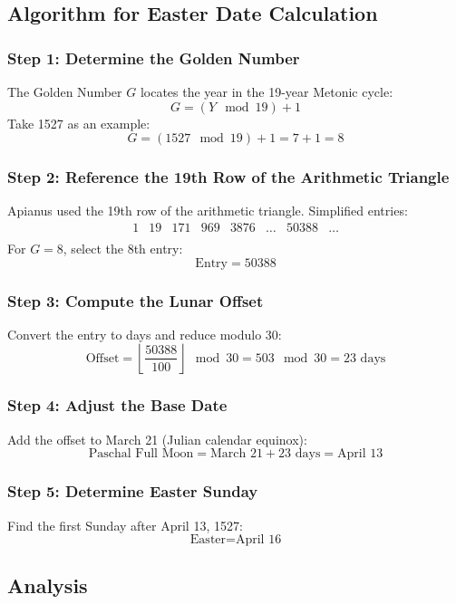 \documentclass{article}
\begin{document}
\subsection{Algorithm for Easter Date Calculation}

\subsubsection{Step 1: Determine the Golden Number}
The Golden Number \( G \) locates the year in the 19-year Metonic cycle:
\[
G = (Y \mod 19) + 1
\]
Take 1527 as an example:
\[
G = (1527 \mod 19) + 1 = 7 + 1 = 8
\]

\subsubsection{Step 2: Reference the 19th Row of the Arithmetic Triangle}
Apianus used the 19th row of the arithmetic triangle. Simplified entries:
\[
\begin{array}{cccccccc}
1 & 19 & 171 & 969 & 3876 & \ldots & 50388 & \ldots \\
\end{array}
\]
For \( G = 8 \), select the 8th entry:
\[
\text{Entry} = 50388
\]

\subsubsection{Step 3: Compute the Lunar Offset}
Convert the entry to days and reduce modulo 30:
\[
\text{Offset} = \left\lfloor \frac{50388}{100} \right\rfloor \mod 30 = 503 \mod 30 = 23 \text{ days}
\]

\subsubsection{Step 4: Adjust the Base Date}
Add the offset to March 21 (Julian calendar equinox):
\[
\text{Paschal Full Moon} = \text{March 21} + 23 \text{ days} = \text{April 13}
\]

\subsubsection{Step 5: Determine Easter Sunday}
Find the first Sunday after April 13, 1527:
\[
\text{Easter} = \text{April 16}
\]

\subsection{Analysis}
\end{document}
